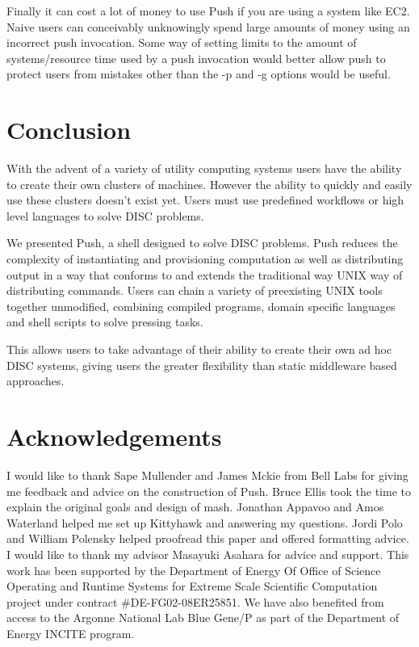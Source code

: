 \documentclass[10pt,conference,letterpaper]{IEEEtran}
\begin{document}
Finally it can cost a lot of money to use Push if you are using a system like EC2. Naive users can conceivably unknowingly spend large amounts of money using an incorrect push invocation. Some way of setting limits to the amount of systems/resource time used by a push invocation would better allow push to protect users from mistakes other than the -p and -g options would be useful. 
\section{Conclusion}

With the advent of a variety of utility computing systems users have the ability to create their own clusters of machines. However the ability to quickly and easily use these clusters doesn't exist yet. Users must use predefined workflows or high level languages to solve DISC problems.

We presented Push, a shell designed to solve DISC problems. Push reduces the complexity of instantiating and provisioning computation as well as distributing output in a way that conforms to and extends the traditional way UNIX way of distributing commands. Users can chain a variety of preexisting UNIX tools together unmodified, combining compiled programs, domain specific languages and shell scripts to solve pressing tasks.

This allows users to take advantage of their ability to create their own ad hoc DISC systems, giving users the greater flexibility than static middleware based approaches. 

\section{Acknowledgements}
 
I would like to thank Sape Mullender and James Mckie from Bell Labs for giving me feedback and advice on the construction of Push. Bruce Ellis took the time to explain the original goals and design of mash. Jonathan Appavoo and Amos Waterland helped me set up Kittyhawk and answering my questions.  Jordi Polo and William Polensky helped proofread this paper and offered formatting advice. I would like to thank my advisor Masayuki Asahara for advice and support. This work has been supported by the Department of Energy Of Office of Science Operating and Runtime Systems for Extreme Scale Scientific Computation project under contract \#DE-FG02-08ER25851. We have also benefited from access to the Argonne National Lab Blue Gene/P as part of the Department of Energy INCITE program.






\end{document}
